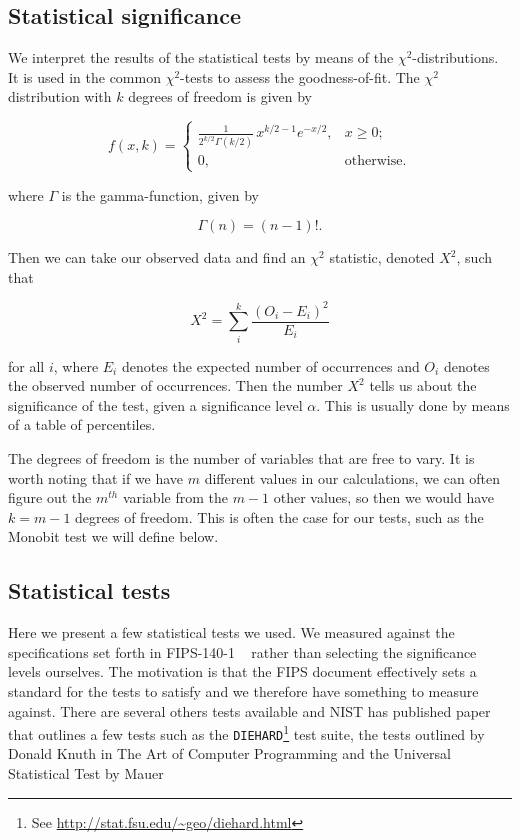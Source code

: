 \documentclass[a4paper]{article}           %
\begin{document}
\subsection{Statistical significance}

We interpret the results of the statistical tests by means of the $\chi^2$-distributions. It is used in the common $\chi^2$-tests to assess the goodness-of-fit. The $\chi^2$ distribution with $k$ degrees of freedom is given by

\[
f(x, k) =
\begin{cases}
  \frac{1}{2^{k/2}\Gamma(k/2)}\,x^{k/2 - 1} e^{-x/2},  & x \geq 0; \\ 0, & \text{otherwise}.
\end{cases}
\]

where $\Gamma$ is the gamma-function, given by

\[
\Gamma(n) = (n-1)!.
\]

Then we can take our observed data and find an $\chi^2$ statistic, denoted $X^2$, such that

\[
X^2 = \sum_i^k \frac{(O_i - E_i)^2}{E_i}
\]

for all $i$, where $E_i$ denotes the expected number of occurrences and $O_i$ denotes the observed number of occurrences. Then the number $X^2$ tells us about the significance of the test, given a significance level $\alpha$. This is usually done by means of a table of percentiles. 

The degrees of freedom is the number of variables that are free to vary. It is worth noting that if we have $m$ different values in our calculations, we can often figure out the $m^{th}$ variable from the $m-1$ other values, so then we would have $k=m-1$ degrees of freedom. This is often the case for our tests, such as the Monobit test we will define below.

\subsection{Statistical tests}
\label{sec:stattests}

 Here we present a few statistical tests we used. We measured against the specifications set forth in FIPS-140-1 ~\cite{fips140, menezes1996} rather than selecting the significance levels ourselves. The motivation is that the FIPS document effectively sets a standard for the tests to satisfy and we therefore have something to measure against. There are several others tests available and NIST has published paper ~\cite{nist} that outlines a few tests such as the \texttt{DIEHARD}\footnote{See \url{http://stat.fsu.edu/~geo/diehard.html}} test suite, the tests outlined by Donald Knuth in The Art of Computer Programming and the Universal Statistical Test by Mauer ~\cite{mauer}
\end{document}
